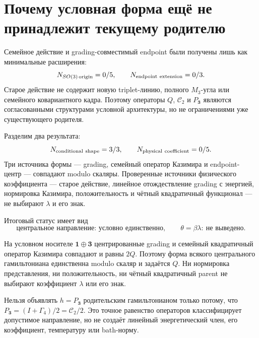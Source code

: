 \section{Почему условная форма ещё не принадлежит текущему родителю}

Семейное действие и grading-совместимый endpoint были получены лишь как
минимальные расширения:
\begin{equation}
 N_{SO(3)\,\rm origin}=0/5,
 \qquad
 N_{\rm endpoint\ extension}=0/3.
 \label{eq:v8-baryon-c0-central-gap-unoriginated-structure-ledgers}
\end{equation}
Старое действие не содержит новую triplet-линию, полного $M_3$-угла или
семейного ковариантного кадра. Поэтому операторы $Q$, $\mathcal C_2$ и
$P_{\mathbf3}$ являются согласованными структурами условной архитектуры,
но не ограничениями уже существующего родителя.

Разделим два результата:
\begin{equation}
 N_{\rm conditional\ shape}=3/3,
 \qquad
 N_{\rm physical\ coefficient}=0/5.
 \label{eq:v8-baryon-c0-central-gap-shape-coefficient-ledger}
\end{equation}
Три источника формы --- grading, семейный оператор Казимира и endpoint-
центр --- совпадают modulo скаляры. Проверенные источники физического
коэффициента --- старое действие, линейное отождествление grading с
энергией, нормировка Казимира, положительность и чётный квадратичный
функционал --- не выбирают $\lambda$ и его знак.

Итоговый статус имеет вид
\begin{equation}
 \text{центральное направление: условно единственно},
 \qquad
 \theta=\beta\lambda:\ \text{не выведено}.
 \label{eq:v8-baryon-c0-central-gap-parent-origin-verdict}
\end{equation}

\begin{theorem}
На условном носителе $\mathbf1\oplus\mathbf3$ центрированные grading и
семейный квадратичный оператор Казимира совпадают и равны $2Q$. Поэтому
форма всякого центрального гамильтониана единственна modulo скаляр и
задаётся $Q$. Ни нормировка представления, ни положительность, ни чётный
квадратичный parent не выбирают коэффициент $\lambda$ или его знак.
\end{theorem}

\begin{nogocriterion}
Нельзя объявлять $h=P_{\mathbf3}$ родительским гамильтонианом только потому,
что $P_{\mathbf3}=(I+\Gamma_4)/2=\mathcal C_2/2$. Это точное равенство
операторов классифицирует допустимое направление, но не создаёт линейный
энергетический член, его коэффициент, температуру или bath-норму.
\end{nogocriterion}

